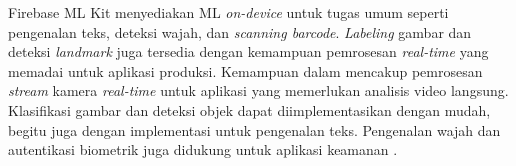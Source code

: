 Firebase ML Kit menyediakan \api ML \emph{on-device} untuk tugas umum seperti pengenalan teks, deteksi wajah, dan \emph{scanning barcode}. \emph{Labeling} gambar dan deteksi \emph{landmark} juga tersedia dengan kemampuan pemrosesan \emph{real-time} yang memadai untuk aplikasi produksi. Kemampuan \cv dalam \flutter mencakup pemrosesan \emph{stream} kamera \emph{real-time} untuk aplikasi yang memerlukan analisis video langsung. Klasifikasi gambar dan deteksi objek dapat diimplementasikan dengan mudah, begitu juga dengan implementasi \ocr untuk pengenalan teks. Pengenalan wajah dan autentikasi biometrik juga didukung untuk aplikasi keamanan \parencite{flutteronnx2022}.
